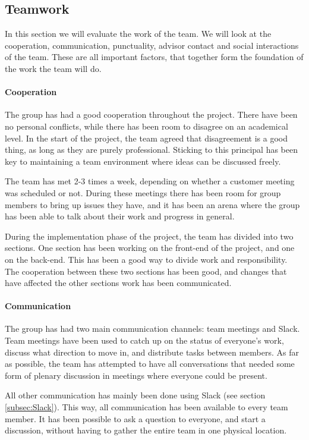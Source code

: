 \documentclass[11pt,a4paper,titlepage,oneside]{report}
\begin{document}
\subsection{Teamwork}
\label{subsec:Teamwork}
In this section we will evaluate the work of the team. We will look at the cooperation, communication, punctuality, advisor contact and social interactions of the team. These are all important factors, that together form the foundation of the work the team will do.

\paragraph{Cooperation}
The group has had a good cooperation throughout the project. There have been no personal conflicts, while there has been room to disagree on an academical level. In the start of the project, the team agreed that disagreement is a good thing, as long as they are purely professional. Sticking to this principal has been key to maintaining a team environment where ideas can be discussed freely. 

The team has met 2-3 times a week, depending on whether a customer meeting was scheduled or not. During these meetings there has been room for group members to bring up issues they have, and it has been an arena where the group has been able to talk about their work and progress in general. 

During the implementation phase of the project, the team has divided into two sections. One section has been working on the \gls{front-end} of the project, and one on the \gls{back-end}. This has been a good way to divide work and responsibility. The cooperation between these two sections has been good, and changes that have affected the other sections work has been communicated. 

\paragraph{Communication}
The group has had two main communication channels: team meetings and Slack. Team meetings have been used to catch up on the status of everyone's work, discuss what direction to move in, and distribute tasks between members. As far as possible, the team has attempted to have all conversations that needed some form of plenary discussion in meetings where everyone could be present.

All other communication has mainly been done using Slack (see section \ref{subsec:Slack}). This way, all communication has been available to every team member. It has been possible to ask a question to everyone, and start a discussion, without having to gather the entire team in one physical location.
\end{document}
